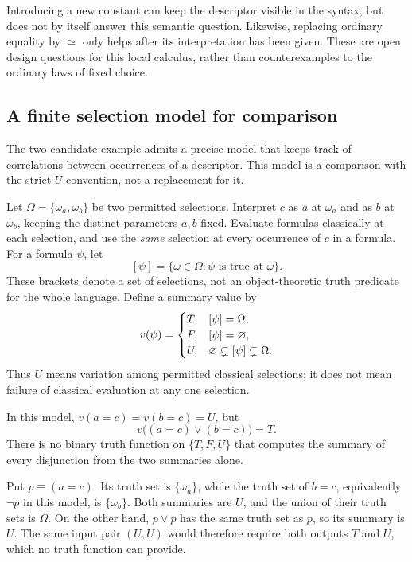 Introducing a new constant can keep the descriptor visible in the syntax,
but does not by itself answer this semantic question. Likewise, replacing
ordinary equality by $\simeq$ only helps after its interpretation has been
given. These are open design questions for this local calculus, rather than
counterexamples to the ordinary laws of fixed choice.

\subsection{A finite selection model for comparison}
The two-candidate example admits a precise model that keeps track of
correlations between occurrences of a descriptor. This model is a comparison
with the strict $U$ convention, not a replacement for it.

Let $\Omega=\{\omega_a,\omega_b\}$ be two permitted selections. Interpret
$c$ as $a$ at $\omega_a$ and as $b$ at $\omega_b$, keeping the distinct
parameters $a,b$ fixed. Evaluate formulas classically at each selection,
and use the \emph{same} selection at every occurrence of $c$ in a formula.
For a formula $\psi$, let
\[
[\psi]=\{\omega\in\Omega:\psi\text{ is true at }\omega\}.
\]
These brackets denote a set of selections, not an object-theoretic truth
predicate for the whole language. Define a summary value by
\[
v(\psi)=
\begin{cases}
T,&[\psi]=\Omega,\\
F,&[\psi]=\varnothing,\\
U,&\varnothing\subsetneq[\psi]\subsetneq\Omega.
\end{cases}
\]
Thus $U$ means variation among permitted classical selections; it does not
mean failure of classical evaluation at any one selection.

\begin{theorem}
In this model, $v(a=c)=v(b=c)=U$, but
\[
v\bigl((a=c)\lor(b=c)\bigr)=T.
\]
There is no binary truth function on $\{T,F,U\}$ that computes the summary
of every disjunction from the two summaries alone.
\end{theorem}
\Proof
Put $p\equiv(a=c)$. Its truth set is $\{\omega_a\}$, while the truth
set of $b=c$, equivalently $\neg p$ in this model, is $\{\omega_b\}$.
Both summaries are $U$, and the union of their truth sets is $\Omega$.
On the other hand, $p\lor p$ has the same truth set as $p$, so its summary
is $U$. The same input pair $(U,U)$ would therefore require both outputs
$T$ and $U$, which no truth function can provide.
\Done

